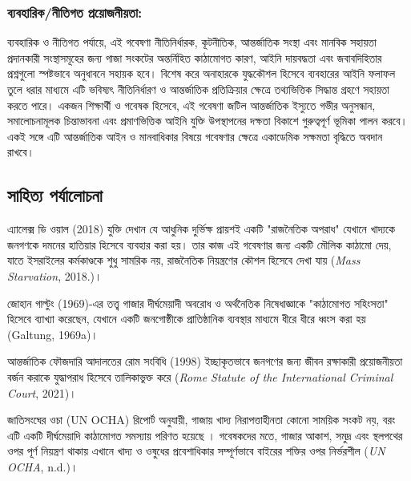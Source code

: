 \subsubsection{ব্যবহারিক/নীতিগত প্রয়োজনীয়তা:}\label{ux9acux9afux9acux9b9ux9b0ux995ux9a8ux9a4ux997ux9a4-ux9aaux9b0ux9dfux99cux9a8ux9dfux9a4}

ব্যবহারিক ও নীতিগত পর্যায়ে, এই গবেষণা নীতিনির্ধারক, কূটনীতিক, আন্তর্জাতিক সংস্থা এবং মানবিক সহায়তা প্রদানকারী সংস্থাসমূহের জন্য গাজা সংকটের অন্তর্নিহিত কাঠামোগত কারণ, আইনি দায়বদ্ধতা এবং জবাবদিহিতার প্রশ্নগুলো স্পষ্টভাবে অনুধাবনে সহায়ক হবে। বিশেষ করে অনাহারকে যুদ্ধকৌশল হিসেবে ব্যবহারের আইনি ফলাফল তুলে ধরার মাধ্যমে এটি ভবিষ্যৎ নীতিনির্ধারণ ও আন্তর্জাতিক প্রতিক্রিয়ার ক্ষেত্রে তথ্যভিত্তিক সিদ্ধান্ত গ্রহণে সহায়তা করতে পারে। একজন শিক্ষার্থী ও গবেষক হিসেবে, এই গবেষণা জটিল আন্তর্জাতিক ইস্যুতে গভীর অনুসন্ধান, সমালোচনামূলক চিন্তাভাবনা এবং প্রমাণভিত্তিক আইনি যুক্তি উপস্থাপনের দক্ষতা বিকাশে গুরুত্বপূর্ণ ভূমিকা পালন করবে। একই সঙ্গে এটি আন্তর্জাতিক আইন ও মানবাধিকার বিষয়ে গবেষণার ক্ষেত্রে একাডেমিক সক্ষমতা বৃদ্ধিতে অবদান রাখবে।

\subsection{\texorpdfstring{সাহিত্য পর্যালোচনা}{১.৬ সাহিত্য পর্যালোচনা}}\label{ux9b8ux9b9ux9a4ux9af-ux9aaux9b0ux9afux9b2ux99aux9a8}

এ্যালেক্স ডি ওয়াল (2018) যুক্তি দেখান যে আধুনিক দুর্ভিক্ষ প্রায়শই একটি "রাজনৈতিক অপরাধ" যেখানে খাদ্যকে জনগণকে দমনের হাতিয়ার হিসেবে ব্যবহার করা হয়। তার কাজ এই গবেষণার জন্য একটি মৌলিক কাঠামো দেয়, যাতে ইসরাইলের কর্মকাণ্ডকে শুধু সামরিক নয়, রাজনৈতিক নিয়ন্ত্রণের কৌশল হিসেবে দেখা যায় (\emph{Mass Starvation}, 2018.)।

জোহান গাল্টুং (1969)-এর তত্ত্ব গাজার দীর্ঘমেয়াদী অবরোধ ও অর্থনৈতিক নিষেধাজ্ঞাকে "কাঠামোগত সহিংসতা" হিসেবে ব্যাখ্যা করেছেন, যেখানে একটি জনগোষ্ঠীকে প্রাতিষ্ঠানিক ব্যবস্থার মাধ্যমে ধীরে ধীরে ধ্বংস করা হয় (Galtung, 1969a)।

আন্তর্জাতিক ফৌজদারি আদালতের রোম সংবিধি (1998) ইচ্ছাকৃতভাবে জনগণের জন্য জীবন রক্ষাকারী প্রয়োজনীয়তা বর্জন করাকে যুদ্ধাপরাধ হিসেবে তালিকাভুক্ত করে (\emph{Rome Statute of the International Criminal Court}, 2021)।

জাতিসংঘের ওচা (UN OCHA) রিপোর্ট অনুযায়ী, গাজায় খাদ্য নিরাপত্তাহীনতা কোনো সাময়িক সংকট নয়, বরং এটি একটি দীর্ঘমেয়াদি কাঠামোগত সমস্যায় পরিণত হয়েছে । গবেষকদের মতে, গাজার আকাশ, সমুদ্র এবং স্থলপথের ওপর পূর্ণ নিয়ন্ত্রণ থাকায় এখানে খাদ্য ও ওষুধের প্রবেশাধিকার সম্পূর্ণভাবে বাইরের শক্তির ওপর নির্ভরশীল (\emph{UN OCHA}, n.d.)।

